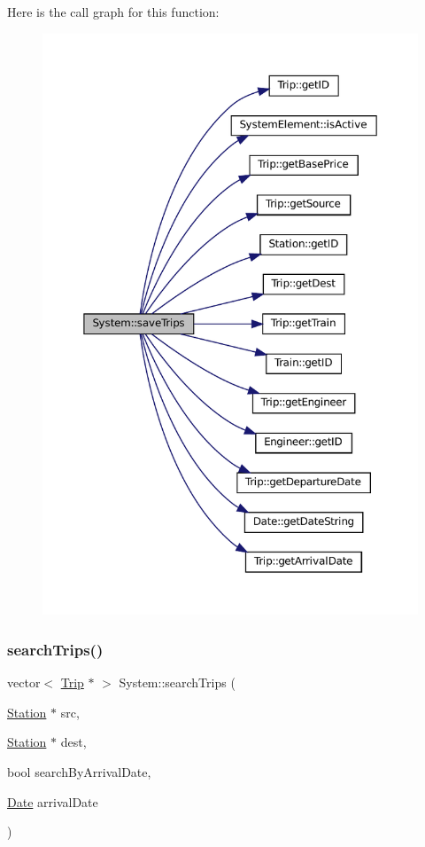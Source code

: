 Here is the call graph for this function\+:
\nopagebreak
\begin{figure}[H]
\begin{center}
\leavevmode
\includegraphics[width=350pt]{classSystem_ab0f54bdbc0d263d96d17e6fd38328c1e_cgraph}
\end{center}
\end{figure}
\mbox{\label{classSystem_a293b247432ab577c9bf0ba7285a6eeda}} 
\subsubsection{\texorpdfstring{search\+Trips()}{searchTrips()}}
{\footnotesize\ttfamily vector$<$ \mbox{\hyperlink{classTrip}{Trip}} $\ast$ $>$ System\+::search\+Trips (\begin{DoxyParamCaption}\item[{\mbox{\hyperlink{classStation}{Station}} $\ast$}]{src,  }\item[{\mbox{\hyperlink{classStation}{Station}} $\ast$}]{dest,  }\item[{bool}]{search\+By\+Arrival\+Date,  }\item[{\mbox{\hyperlink{classDate}{Date}}}]{arrival\+Date }\end{DoxyParamCaption})}



